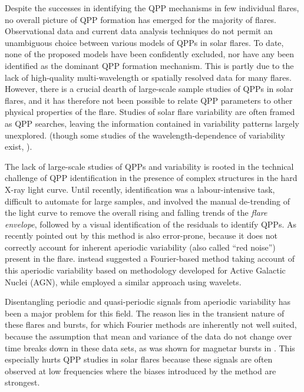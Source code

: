 \documentclass{aastex61}
\begin{document}
Despite the successes in identifying the QPP mechanisms in few individual flares, no overall picture of QPP formation has emerged for the majority of flares. 
Observational data and current data analysis techniques do not permit an unambiguous choice between various models of QPPs in solar flares.
To date, none of the proposed models have been confidently excluded, nor have any been identified as the dominant QPP formation mechanism. 
This is partly due to the lack of high-quality multi-wavelength or spatially resolved data for many flares. 
However, there is a crucial dearth of large-scale sample studies of QPPs in solar flares, and it has therefore not been possible to relate QPP parameters to other physical properties of the flare. 
Studies of solar flare variability are often framed as QPP searches, leaving the information contained in variability patterns largely unexplored. (though some studies of the wavelength-dependence of variability exist, \citep{mcateer2007}).

The lack of large-scale studies of QPPs and variability is rooted in the technical challenge of QPP identification in the presence of complex structures in the hard X-ray light curve. 
Until recently, identification was a labour-intensive task, difficult to automate for large samples, and involved the manual de-trending of the light curve to remove the overall rising and falling trends of the \textit{flare envelope}, followed by a visual identification of the residuals to identify QPPs. 
As recently pointed out by \citep{inglis2015} this method is also error-prone, because it does not correctly account for inherent aperiodic variability (also called ``red noise'') present in the flare.
\citep{inglis2015} instead suggested a Fourier-based method taking account of this aperiodic variability based on methodology developed for Active Galactic Nuclei (AGN), while \citep{simoes2015} employed a similar approach using wavelets. 

Disentangling periodic and quasi-periodic signals from aperiodic variability has been a major problem for this field. 
The reason lies in the transient nature of these flares and bursts, for which Fourier methods are inherently not well suited, because the assumption that mean and variance of the data do not change over time breaks down in these data sets, as was shown for magnetar bursts in . 
This especially hurts QPP studies in solar flares because these signals are often observed at low frequencies where the biases introduced by the method are strongest. 
\end{document}
